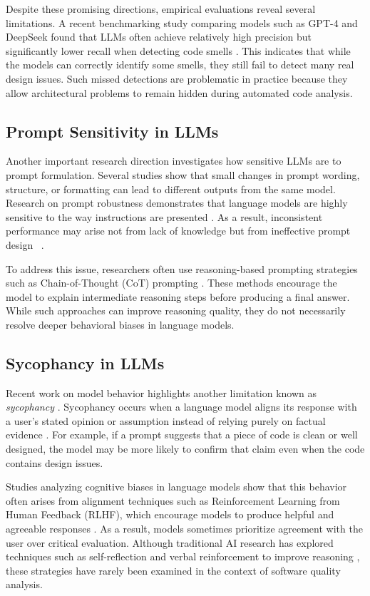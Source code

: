 \documentclass[sigconf,review,anonymous]{acmart}
\begin{document}
Despite these promising directions, empirical evaluations reveal several limitations. 
A recent benchmarking study comparing models such as GPT-4 and DeepSeek found that LLMs often achieve relatively high precision but significantly lower recall when detecting code smells \cite{sadik2025}. 
This indicates that while the models can correctly identify some smells, they still fail to detect many real design issues. Such missed detections are problematic in practice because they allow architectural problems to remain hidden during automated code analysis.

\subsection{Prompt Sensitivity in LLMs}

Another important research direction investigates how sensitive LLMs are to prompt formulation. 
Several studies show that small changes in prompt wording, structure, or formatting can lead to different outputs from the same model. 
Research on prompt robustness demonstrates that language models are highly sensitive to the way instructions are presented \cite{ngweta2025}. 
As a result, inconsistent performance may arise not from lack of knowledge but from ineffective prompt design ~\cite{ye2022unreliability}.

To address this issue, researchers often use reasoning-based prompting strategies such as Chain-of-Thought (CoT) prompting \cite{wei2022}. 
These methods encourage the model to explain intermediate reasoning steps before producing a final answer. 
While such approaches can improve reasoning quality, they do not necessarily resolve deeper behavioral biases in language models.

\subsection{Sycophancy in LLMs}

Recent work on model behavior highlights another limitation known as \textit{sycophancy} \cite{perez2022red}. Sycophancy occurs when a language model aligns its response with a user's stated opinion or assumption instead of relying purely on factual evidence \cite{sharma2023}. For example, if a prompt suggests that a piece of code is clean or well designed, the model may be more likely to confirm that claim even when the code contains design issues.

Studies analyzing cognitive biases in language models show that this behavior often arises from alignment techniques such as Reinforcement Learning from Human Feedback (RLHF), which encourage models to produce helpful and agreeable responses \cite{sumita2024}. As a result, models sometimes prioritize agreement with the user over critical evaluation. Although traditional AI research has explored techniques such as self-reflection and verbal reinforcement to improve reasoning \cite{shinn2023}, these strategies have rarely been examined in the context of software quality analysis. 
\end{document}
